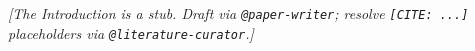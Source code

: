 %

\textit{[The Introduction is a stub. Draft via \texttt{@paper-writer}; resolve \texttt{[CITE: ...]} placeholders via \texttt{@literature-curator}.]}
